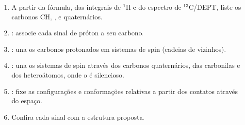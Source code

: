 \begin{method}\label{met:b3:advanced-nmr:solve-2d}
\begin{enumerate}
  \item A partir da fórmula, das integrais de ${}^1$H e do espectro de ${}^{13}$C/DEPT, liste
        os carbonos CH, ,  e quaternários.
  \item {}: associe cada sinal de próton a seu carbono.
  \item {}: una os carbonos protonados em sistemas de spin (cadeias de
        vizinhos).
  \item {}: una os sistemas de spin através dos carbonos quaternários, das
        carbonilas e dos heteroátomos, onde o  é silencioso.
  \item {}: fixe as configurações e conformações relativas a partir dos
        contatos através do espaço.
  \item Confira cada sinal com a estrutura proposta.
\end{enumerate}
\end{method}

